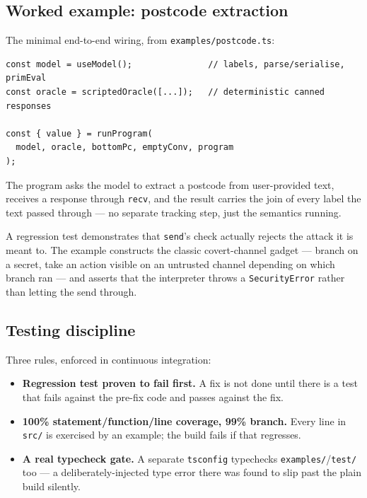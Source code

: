 \documentclass[11pt, a4paper]{article}
\begin{document}
\subsection{Worked example: postcode extraction}

The minimal end-to-end wiring, from \texttt{examples/postcode.ts}:

\begin{lstlisting}
const model = useModel();               // labels, parse/serialise, primEval
const oracle = scriptedOracle([...]);   // deterministic canned responses

const { value } = runProgram(
  model, oracle, bottomPc, emptyConv, program
);
\end{lstlisting}

The program asks the model to extract a postcode from user-provided text,
receives a response through \lstinline{recv}, and the result carries the
join of every label the text passed through --- no separate tracking
step, just the semantics running.

A regression test demonstrates that \lstinline{send}'s check actually
rejects the attack it is meant to. The example constructs the classic
covert-channel gadget --- branch on a secret, take an action visible on an
untrusted channel depending on which branch ran --- and asserts that the
interpreter throws a \lstinline{SecurityError} rather than letting the
send through.

\subsection{Testing discipline}

Three rules, enforced in continuous integration:

\begin{itemize}
  \item \textbf{Regression test proven to fail first.} A fix is not done
    until there is a test that fails against the pre-fix code and passes
    against the fix.
  \item \textbf{100\% statement/function/line coverage, 99\% branch.}
    Every line in \texttt{src/} is exercised by an example; the build
    fails if that regresses.
  \item \textbf{A real typecheck gate.} A separate \texttt{tsconfig}
    typechecks \texttt{examples/}/\texttt{test/} too --- a
    deliberately-injected type error there was found to slip past the
    plain build silently.
\end{itemize}
\end{document}
